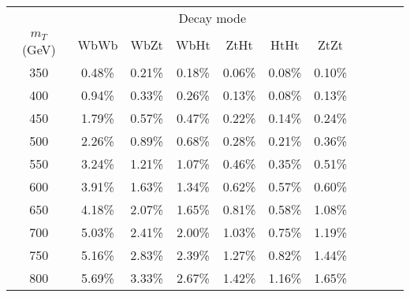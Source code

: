 \begin{tabular}{c c c c c c c c c c c } \toprule
 & \multicolumn{6}{c}{ Decay mode } \\
 $m_{T}$ (GeV)  & WbWb 		 & WbZt 		 & WbHt 		 & ZtHt 		 & HtHt 		 & ZtZt 		 \\ \midrule 
 350 & 0.48\% & 0.21\% & 0.18\% & 0.06\% & 0.08\% & 0.10\%\\ 
400 & 0.94\% & 0.33\% & 0.26\% & 0.13\% & 0.08\% & 0.13\%\\ 
450 & 1.79\% & 0.57\% & 0.47\% & 0.22\% & 0.14\% & 0.24\%\\ 
500 & 2.26\% & 0.89\% & 0.68\% & 0.28\% & 0.21\% & 0.36\%\\ 
550 & 3.24\% & 1.21\% & 1.07\% & 0.46\% & 0.35\% & 0.51\%\\ 
600 & 3.91\% & 1.63\% & 1.34\% & 0.62\% & 0.57\% & 0.60\%\\ 
650 & 4.18\% & 2.07\% & 1.65\% & 0.81\% & 0.58\% & 1.08\%\\ 
700 & 5.03\% & 2.41\% & 2.00\% & 1.03\% & 0.75\% & 1.19\%\\ 
750 & 5.16\% & 2.83\% & 2.39\% & 1.27\% & 0.82\% & 1.44\%\\ 
800 & 5.69\% & 3.33\% & 2.67\% & 1.42\% & 1.16\% & 1.65\%\\ 
\bottomrule\end{tabular}